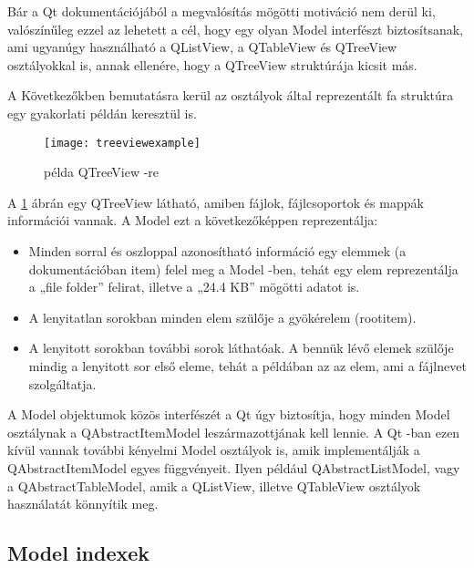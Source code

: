 Bár a Qt dokumentációjából a megvalósítás mögötti motiváció nem derül ki, 
valószínűleg ezzel az lehetett a cél, 
hogy egy olyan Model interfészt biztosítsanak, 
ami ugyanúgy használható 
a {\ttfamily QListView}, a {\ttfamily QTableView} 
és {\ttfamily QTreeView} osztályokkal is, annak ellenére, 
hogy a {\ttfamily QTreeView} struktúrája kicsit más.

A Következőkben bemutatásra kerül az osztályok által reprezentált fa struktúra 
egy gyakorlati példán keresztül is.
\begin{figure}[!htb]
\centering
\texttt{[image: treeviewexample]}
\caption{példa QTreeView -re}
\label{fig:x treeviewexample}
\end{figure}
\newline
A \ref{fig:x treeviewexample} ábrán egy {\ttfamily QTreeView} látható, 
amiben fájlok, fájlcsoportok és mappák információi vannak. 
A Model ezt a következőképpen reprezentálja:
\begin{itemize}
\item
Minden sorral és oszloppal azonosítható információ 
egy elemmek (a dokumentációban item) felel meg a Model -ben,
tehát egy elem reprezentálja a „file folder” felirat, 
illetve a „24.4 KB” mögötti adatot is.
\item
A lenyitatlan sorokban minden elem szülője a gyökérelem (rootitem).
\item
A lenyitott sorokban további sorok láthatóak. 
A bennük lévő elemek szülője mindig a lenyitott sor első eleme, 
tehát a példában az az elem, ami a fájlnevet szolgáltatja.
\end{itemize}

A Model objektumok közös interfészét a Qt úgy biztosítja, 
hogy minden Model osztálynak a 
{\ttfamily QAbstractItemModel} leszármazottjának kell lennie. 
A Qt -ban ezen kívül vannak további kényelmi Model osztályok is, 
amik implementálják a {\ttfamily QAbstractItemModel} egyes függvényeit. 
Ilyen például {\ttfamily QAbstractListModel}, 
vagy a {\ttfamily QAbstractTableModel}, 
amik a {\ttfamily QListView}, 
illetve {\ttfamily QTableView} osztályok használatát könnyítik meg. 

\subsection{Model indexek}

